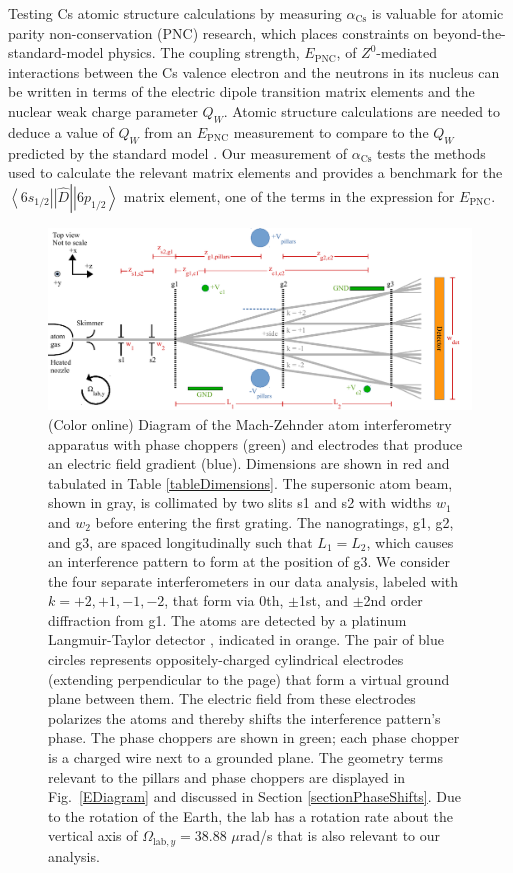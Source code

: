 \documentclass[twocolumn,pra,showpacs,superscriptaddress,longbibliography]{revtex4-1}   %
\newcommand{\brakett}[3]{\left.\left\langle #1 \right|\right|#2\left|\left| #3 \right\rangle\right.}
\newcommand{\figref}[1]{Fig.~\ref{#1}}
\newcommand{\acs}{\alpha_{\textrm{Cs}}}
\newcommand{\Omegalab}{\Omega_{\mathrm{lab},y}}
\begin{document}
Testing Cs atomic structure calculations by measuring $\acs$ is valuable for atomic parity non-conservation (PNC) research, which places constraints on beyond-the-standard-model physics. The coupling strength, $E_{\mathrm{PNC}}$, of $Z^0$-mediated interactions between the Cs valence electron and the neutrons in its nucleus can be written in terms of the electric dipole transition matrix elements and the nuclear weak charge parameter $Q_W$. Atomic structure calculations are needed to deduce a value of $Q_W$ from an $E_{\mathrm{PNC}}$ measurement \cite{Blundell1992,Cho1997,Derevianko2001,Porsev2009} to compare to the $Q_W$ predicted by the standard model \cite{Bouchiat1999,Dzuba2012}. Our measurement of $\acs$ tests the methods used to calculate the relevant matrix elements and provides a benchmark for the $\brakett{6s_{1/2}}{\hat{D}}{6p_{1/2}}$ matrix element, one of the terms in the expression for $E_{\mathrm{PNC}}$.

\begin{figure}
\includegraphics[width=\linewidth,keepaspectratio]{IFM_diagram2.pdf}
\caption{\label{IFMDiagram}(Color online) Diagram of the Mach-Zehnder atom interferometry apparatus with phase choppers (green) and electrodes that produce an electric field gradient (blue). Dimensions are shown in red and tabulated in Table \ref{tableDimensions}.  The supersonic atom beam, shown in gray, is collimated by two slits s1 and s2 with widths $w_1$ and $w_2$ before entering the first grating. 
The nanogratings, g1, g2, and g3, are spaced longitudinally such that $L_1 = L_2$, which causes an interference pattern to form at the position of g3.
We consider the four separate interferometers in our data analysis, labeled with $k=+2,+1,-1,-2$, that form via 0th, $\pm$1st, and $\pm$2nd order diffraction from g1.
The atoms are detected by a platinum Langmuir-Taylor detector \cite{Delhuille2002}, indicated in orange.
The pair of blue circles represents oppositely-charged cylindrical electrodes (extending perpendicular to the page) that form a virtual ground plane between them. The electric field from these electrodes polarizes the atoms and thereby shifts the interference pattern's phase. 
The phase choppers are shown in green; each phase chopper is a charged wire next to a grounded plane. The geometry terms relevant to the pillars and phase choppers are displayed in \figref{EDiagram} and discussed in Section \ref{sectionPhaseShifts}.
Due to the rotation of the Earth, the lab has a rotation rate about the vertical axis of $\Omegalab = 38.88$ $\mu$rad/s that is also relevant to our analysis.  }
\end{figure}
\end{document}
